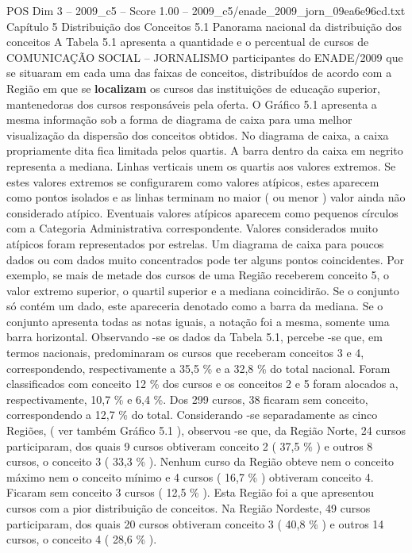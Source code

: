 \begin{textsample}{POS Dim 3 – 2009\_c5 – Score 1.00 – 2009\_c5/enade\_2009\_jorn\_09ea6e96cd.txt}  \label{ex:f3_pos_140}
Capítulo 5 Distribuição dos Conceitos 5.1 Panorama nacional da distribuição dos conceitos A Tabela 5.1 apresenta a quantidade e o percentual de cursos de COMUNICAÇÃO SOCIAL – JORNALISMO participantes do ENADE/2009 que se situaram em cada uma das faixas de conceitos, distribuídos de acordo com a Região em que se \textbf{localizam} os cursos das instituições de educação superior, mantenedoras dos cursos responsáveis pela oferta.
O Gráfico 5.1 apresenta a mesma informação sob a forma de diagrama de caixa para uma melhor visualização da dispersão dos conceitos obtidos.
No diagrama de caixa, a caixa propriamente dita fica limitada pelos quartis.
A barra dentro da caixa em negrito representa a mediana.
Linhas verticais unem os quartis aos valores extremos.
Se estes valores extremos se configurarem como valores atípicos, estes aparecem como pontos isolados e as linhas terminam no maior ( ou menor ) valor ainda não considerado atípico.
Eventuais valores atípicos aparecem como pequenos círculos com a Categoria Administrativa correspondente.
Valores considerados muito atípicos foram representados por estrelas.
Um diagrama de caixa para poucos dados ou com dados muito concentrados pode ter alguns pontos coincidentes.
Por exemplo, se mais de metade dos cursos de uma Região receberem conceito 5, o valor extremo superior, o quartil superior e a mediana coincidirão.
Se o conjunto só contém um dado, este apareceria denotado como a barra da mediana.
Se o conjunto apresenta todas as notas iguais, a notação foi a mesma, somente uma barra horizontal.
Observando -se os dados da Tabela 5.1, percebe -se que, em termos nacionais, predominaram os cursos que receberam conceitos 3 e 4, correspondendo, respectivamente a 35,5 \% e a 32,8 \% do total nacional.
Foram classificados com conceito 12 \% dos cursos e os conceitos 2 e 5 foram alocados a, respectivamente, 10,7 \% e 6,4 \%.
Dos 299 cursos, 38 ficaram sem conceito, correspondendo a 12,7 \% do total.
Considerando -se separadamente as cinco Regiões, ( ver também Gráfico 5.1 ), observou -se que, da Região Norte, 24 cursos participaram, dos quais 9 cursos obtiveram conceito 2 ( 37,5 \% ) e outros 8 cursos, o conceito 3 ( 33,3 \% ).
Nenhum curso da Região obteve nem o conceito máximo nem o conceito mínimo e 4 cursos ( 16,7 \% ) obtiveram conceito 4.
Ficaram sem conceito 3 cursos ( 12,5 \% ).
Esta Região foi a que apresentou cursos com a pior distribuição de conceitos.
Na Região Nordeste, 49 cursos participaram, dos quais 20 cursos obtiveram conceito 3 ( 40,8 \% ) e outros 14 cursos, o conceito 4 ( 28,6 \% ).

\end{textsample}
